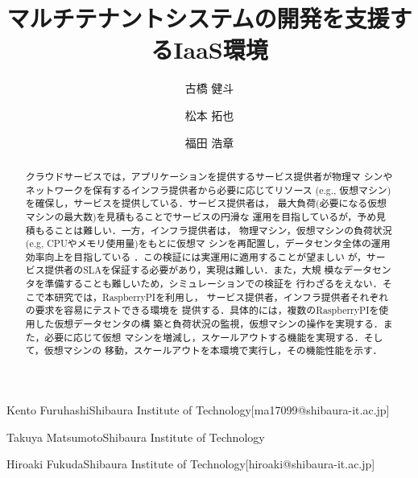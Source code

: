 \documentclass[submit,techrep]{ipsj}
\begin{document}
\title{マルチテナントシステムの開発を支援するIaaS環境}


\author{古橋 健斗}{Kento Furuhashi}{Shibaura Institute of Technology}[ma17099@shibaura-it.ac.jp]
\author{松本 拓也}{Takuya Matsumoto}{Shibaura Institute of Technology}
\author{福田 浩章}{Hiroaki Fukuda}{Shibaura Institute of Technology}[hiroaki@shibaura-it.ac.jp]

\begin{abstract}
クラウドサービスでは，アプリケーションを提供するサービス提供者が物理マ
シンやネットワークを保有するインフラ提供者から必要に応じてリソース
(e.g., 仮想マシン)を確保し，サービスを提供している．サービス提供者は，
最大負荷(必要になる仮想マシンの最大数)を見積もることでサービスの円滑な
運用を目指しているが，予め見積もることは難しい．一方，インフラ提供者は，
物理マシン，仮想マシンの負荷状況(e.g, CPUやメモリ使用量)をもとに仮想マ
シンを再配置し，データセンタ全体の運用効率向上を目指している
．この検証には実運用に適用することが望ましい
が，サービス提供者のSLAを保証する必要があり，実現は難しい．また，大規
模なデータセンタを準備することも難しいため，シミュレーションでの検証を
行わざるをえない．そこで本研究では，RaspberryPIを利用し，
サービス提供者，インフラ提供者それぞれの要求を容易にテストできる環境を
提供する．具体的には，複数のRaspberryPIを使用した仮想データセンタの構
築と負荷状況の監視，仮想マシンの操作を実現する．また，必要に応じて仮想
マシンを増減し，スケールアウトする機能を実現する．そして，仮想マシンの
移動，スケールアウトを本環境で実行し，その機能性能を示す．
\end{abstract}

%
%
%

\maketitle
\end{document}
